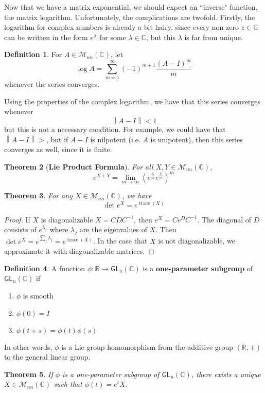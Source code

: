 \documentclass[psamsfonts]{amsart}
\newtheorem{thm}{Theorem}[section]
\theoremstyle{definition}
\newtheorem{defn}[thm]{Definition}
\theoremstyle{remark}
\newcommand{\R}{\mathbb{R}}
\newcommand{\C}{\mathbb{C}}
\newcommand{\M}{\mathcal{M}}
\newcommand{\GL}{\mathsf{GL}}
\newcommand{\inv}{^{-1}}
\newcommand{\norm}[1]{\left\lVert#1\right\rVert}
\DeclareMathOperator{\trace}{trace}
\begin{document}
Now that we have a matrix exponential, we should expect an ``inverse" function, the matrix logarithm. Unfortunately, the complications are twofold. Firstly, the logarithm for complex numbers is already a bit hairy, since every non-zero $z \in \C$ can be written in the form $e^\lambda$ for some $\lambda \in \C$, but this $\lambda$ is far from unique. 

\begin{defn}
For $A \in \M_{nn}(\C)$, let 
$$\log A = \sum_{m = 1}^\infty (-1)^{m+1}\frac{(A-I)^m}{m} $$
whenever the series converges.
\end{defn}
Using the properties of the complex logarithm, we have that this series converges whenever 
$$\norm{A -I} < 1 $$
but this is not a necessary condition. For example, we could have that $\norm{A - I} >$, but if $A - I$ is nilpotent (i.e. $A$ is unipotent), then this series converges as well, since it is finite.

\begin{thm}[\textbf{Lie Product Formula}]
For all $X,Y \in \M_{nn}(\C)$, 
$$e^{X + Y} = \lim_{m \to \infty}\left( e^{\frac{X}{m}}e^{\frac{Y}{m}} \right)^m $$
\end{thm}

\begin{thm}
For any $X \in \M_{nn}(\C)$, we have
$$\det e^X = e^{\trace(X)} $$
\end{thm}

\begin{proof}
If $X$ is diagonalizable $X = CDC\inv$, then $e^X = Ce^DC\inv$. The diagonal of $D$ consists of $e^{\lambda_j}$ where $\lambda_j$ are the eigenvalues of $X$. Then $\det e^X = e^{\sum_j \lambda_j} = e^{\trace (X)}$. In the case that $X$ is not diagonalizable, we approximate it with diagonalizable matrices.
\end{proof}

\begin{defn}
A function $\phi: \R \to \GL_n(\C)$ is a \textbf{one-parameter subgroup} of $\GL_n(\C)$ if 
\begin{enumerate}
\item $\phi$ is smooth
\item $\phi(0) = I$
\item $\phi(t + s) = \phi(t)\phi(s)$
\end{enumerate}
In other words, $\phi$ is a Lie group homomorphism from the additive group $(\R, +)$ to the general linear group.
\end{defn}

\begin{thm}
If $\phi$ is a one-parameter subgroup of $\GL_n(\C)$, there exists a unique $X \in \M_{nn}(\C)$ such that $\phi(t) = e^tX$.
\end{thm}
\end{document}
